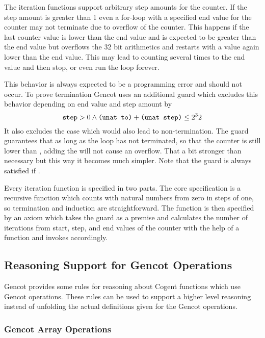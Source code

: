 The iteration functions support arbitrary step amounts for the counter. If the step amount is greater than 1 even a 
for-loop with a specified end value for the counter may not terminate due to overflow of the counter. This happens if
the last counter value  is lower than the end value and  is expected to be greater than the end
value but overflows the 32 bit arithmetics and restarts with a value again lower than the end value. This may lead to
counting several times to the end value and then stop, or even run the loop forever.

This behavior is always expected to be a programming error and should not occur. To prove termination Gencot uses an
additional guard  which excludes this behavior depending on end value  and step
amount  by
$$ \textnormal{\texttt{step}} > 0 \wedge \textnormal{\texttt{(unat to)}} + \textnormal{\texttt{(unat step)}} \le 2^32$$
It also excludes the case  which would also lead to non-termination. The guard guarantees that as 
long as the loop has not terminated, so that the counter is still lower than , adding the  will 
not cause an overflow. That a bit stronger than necessary but this way it becomes much simpler. Note that the guard 
is always satisfied if .

Every iteration function  is specified in two parts. The core specification is a recursive function 
 which counts with natural numbers from zero in steps of one, so termination and induction are 
straightforward. The function  is then specified by an axiom which takes the guard as a premise and 
calculates the number of iterations from start, step, and end values of the counter with the help of a function 
 and invokes  accordingly.

\subsection{Reasoning Support for Gencot Operations}
\label{design-isabelle-gencotrul}

Gencot provides some rules for reasoning about Cogent functions which use Gencot operations. These rules can be used
to support a higher level reasoning instead of unfolding the actual definitions given for the Gencot operations.

\subsubsection{Gencot Array Operations}

